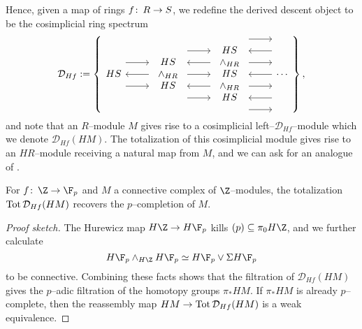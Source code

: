 Hence, given a map of rings $f\colon\thinspace R \to S$, we redefine the derived descent object to be the cosimplicial ring spectrum
\[\mathcal D_{Hf} := \left\{
\begin{tikzcd}[ampersand replacement=\&]
HS \arrow[leftarrow]{r} \arrow[shift left=\baselineskip]{r} \arrow[shift right=\baselineskip]{r} \&
\begin{array}{c} HS \\ \sm_{HR} \\ HS \end{array} \arrow[shift left=(2*\baselineskip)]{r} \arrow[leftarrow, shift left=\baselineskip]{r} \arrow{r} \arrow[leftarrow, shift right=\baselineskip]{r} \arrow[shift right=(2*\baselineskip)]{r} \&
\begin{array}{c} HS \\ \sm_{HR} \\ HS \\ \sm_{HR} \\ HS \end{array} \arrow[shift left=(3*\baselineskip)]{r} \arrow[leftarrow, shift left=(2*\baselineskip)]{r} \arrow[shift left=\baselineskip]{r} \arrow[leftarrow]{r} \arrow[shift right=\baselineskip]{r} \arrow[leftarrow, shift right=(2*\baselineskip)]{r} \arrow[shift right=(3*\baselineskip)]{r} \&
\cdots
\end{tikzcd}
\right\},\]
and note that an $R$--module $M$ gives rise to a cosimplicial left--$\mathcal D_{Hf}$--module which we denote $\mathcal D_{Hf}(HM)$.  The totalization of this cosimplicial module gives rise to an $HR$--module receiving a natural map from $M$, and we can ask for an analogue of .

\begin{lemma}\label{DescentFromHFpToHZp}
For $f\co \Z \to \F_p$ and $M$ a connective complex of $\Z$--modules, the totalization $\operatorname{Tot} \mathcal D_{Hf}(HM)$ recovers the $p$--completion of $M$.
\end{lemma}
\begin{proof}[Proof sketch]
The Hurewicz map $H\Z \to H\F_p$ kills $(p) \subseteq \pi_0 H\Z$, and we further calculate \[H\F_p \sm_{H\Z} H\F_p \simeq H\F_p \vee \Susp H\F_p\] to be connective.  Combining these facts shows that the filtration of $\mathcal D_{Hf}(HM)$ gives the $p$--adic filtration of the homotopy groups $\pi_* HM$.  If $\pi_* HM$ is already $p$--complete, then the reassembly map $HM \to \operatorname{Tot} \mathcal D_{Hf}(HM)$ is a weak equivalence.
\end{proof}

